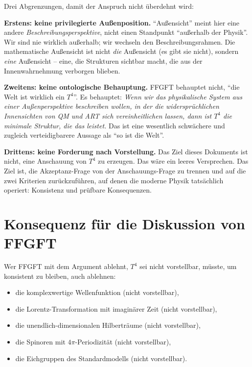 Drei Abgrenzungen, damit der Anspruch nicht überdehnt wird:

\textbf{Erstens: keine privilegierte Außenposition.} \enquote{Außensicht}
meint hier eine andere \emph{Beschreibungsperspektive}, nicht einen
Standpunkt \enquote{außerhalb der Physik}. Wir sind nie wirklich außerhalb;
wir wechseln den Beschreibungsrahmen. Die mathematische Außensicht ist
nicht \emph{die} Außensicht (es gibt sie nicht), sondern \emph{eine}
Außensicht -- eine, die Strukturen sichtbar macht, die aus der
Innenwahrnehmung verborgen blieben.

\textbf{Zweitens: keine ontologische Behauptung.} FFGFT behauptet nicht,
\enquote{die Welt ist wirklich ein $T^4$}. Es behauptet: \emph{Wenn wir das
physikalische System aus einer Außenperspektive beschreiben wollen,
in der die widersprüchlichen Innensichten von QM und ART sich
vereinheitlichen lassen, dann ist $T^4$ die minimale Struktur, die
das leistet.} Das ist eine wesentlich schwächere und zugleich
verteidigbarere Aussage als \enquote{so ist die Welt}.

\textbf{Drittens: keine Forderung nach Vorstellung.} Das Ziel dieses
Dokuments ist nicht, eine Anschauung von $T^4$ zu erzeugen. Das wäre
ein leeres Versprechen. Das Ziel ist, die Akzeptanz-Frage von der
Anschauungs-Frage zu trennen und auf die zwei Kriterien zurückzuführen,
auf denen die moderne Physik tatsächlich operiert: Konsistenz und
prüfbare Konsequenzen.

\section{Konsequenz für die Diskussion von FFGFT}

Wer FFGFT mit dem Argument ablehnt, $T^4$ sei nicht vorstellbar, müsste,
um konsistent zu bleiben, auch ablehnen:
\begin{itemize}[leftmargin=2em,itemsep=2pt,topsep=2pt]
  \item die komplexwertige Wellenfunktion (nicht vorstellbar),
  \item die Lorentz-Transformation mit imaginärer Zeit (nicht
        vorstellbar),
  \item die unendlich-dimensionalen Hilberträume (nicht vorstellbar),
  \item die Spinoren mit $4\pi$-Periodizität (nicht vorstellbar),
  \item die Eichgruppen des Standardmodells (nicht vorstellbar).
\end{itemize}

